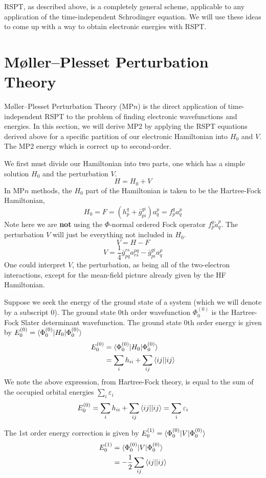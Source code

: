 \documentclass{article}
\newcommand{\eps}{\varepsilon}
\begin{document}
RSPT, as described above, is a completely general scheme, applicable to any application of the time-independent Schrodinger equation.
We will use these ideas to come up with a way to obtain electronic energies with RSPT. 

\section{M{\o}ller--Plesset Perturbation Theory}
M{\o}ller--Plesset Perturbation Theory (MP$n$) is the direct application of time-independent RSPT to the problem of finding electronic wavefunctions and energies.
In this section, we will derive MP2 by applying the RSPT equations derived above for a specific partition of our electronic Hamiltonian into $H_0$ and $V$.
The MP2 energy which is correct up to second-order.

We first must divide our Hamiltonian into two parts, one which has a simple solution $H_0$ and the perturbation $V$.
\[H = H_0 + V \]
In MP$n$ methods, the $H_0$ part of the Hamiltonian is taken to be the Hartree-Fock Hamiltonian,
\[H_0 = F = (h_p^q + \bar{g}_{pi}^{qi}) a_q^p = f_p^q a_q^p  \]
Note here we are \textbf{not} using the $\Phi$-normal ordered Fock operator $f_p^q \tilde{a}_q^p$.
The perturbation $V$ will just be everything not included in $H_0$. 
\[V = H - F \]
\[V =  \frac{1}{4} \bar{g}_{pq}^{rs} a_{rs}^{pq} - \bar{g}_{pi}^{qi} a_{q}^{p}  \]
One could interpret $V$, the perturbation, as being all of the two-electron interactions, except for the mean-field picture already given by the HF Hamiltonian.

Suppose we seek the energy of the ground state of a system (which we will denote by a subscript 0).
The ground state 0th order wavefunction $\Phi_0^{(0)}$ is the Hartree-Fock Slater determinant wavefunction. 
The ground state 0th order energy is given by $E_0^{(0)} = \braket{\Phi_0^{(0)} | H_0 | \Phi_0^{(0)}}$
\begin{align*}
E_0^{(0)} &= \braket{\Phi_0^{(0)} | H_0 | \Phi_0^{(0)}} \\
          &= \sum_i h_{ii} + \sum_{ij} \braket{ij||ij}  
\end{align*}
We note the above expression, from Hartree-Fock theory, is equal to the sum of the occupied orbital energies $\sum_i \eps_i$
\[E_0^{(0)} = \sum_i h_{ii} + \sum_{ij} \braket{ij||ij} = \sum_i \eps_i  \]

The 1st order energy correction is given by $E_0^{(1)} = \braket{\Phi_0^{(0)} | V | \Phi_0^{(0)}}$
\begin{align*}
E_0^{(1)} &= \braket{\Phi_0^{(0)} | V | \Phi_0^{(0)}} \\
          &= -\frac{1}{2} \sum_{ij} \braket{ij||ij} 
\end{align*}
\end{document}
